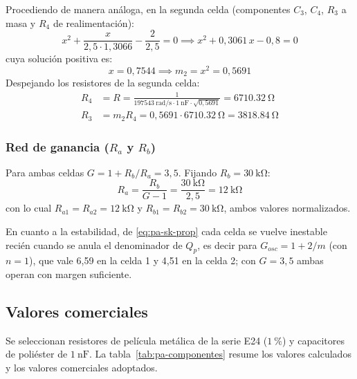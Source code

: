 Procediendo de manera análoga, en la segunda celda (componentes $C_3$, $C_4$, $R_3$ a masa y $R_4$ de
realimentación):
\begin{equation}
  x^2 + \frac{x}{2{,}5 \cdot 1{,}3066} - \frac{2}{2{,}5} = 0 \implies x^2 + 0{,}3061\,x - 0{,}8 = 0
\end{equation}
cuya solución positiva es:
\begin{equation}
  x = 0{,}7544 \implies m_2 = x^2 = 0{,}5691
\end{equation}
Despejando los resistores de la segunda celda:
\begin{align*}
  R_4 &= R = \frac{1}{\SI{197543}{\radian/\second} \cdot \SI{1}{\nano\farad} \cdot \sqrt{0{,}5691}}
    = \SI{6710.32}{\ohm} \\
  R_3 &= m_2 R_4 = 0{,}5691 \cdot \SI{6710.32}{\ohm} = \SI{3818.84}{\ohm}
\end{align*}

\subsubsection{Red de ganancia ($R_a$ y $R_b$)}

Para ambas celdas $G = 1 + R_b / R_a = 3{,}5$. Fijando $R_b = \SI{30}{\kilo\ohm}$:
\begin{equation}
  R_a = \frac{R_b}{G - 1} = \frac{\SI{30}{\kilo\ohm}}{2{,}5} = \SI{12}{\kilo\ohm}
\end{equation}
con lo cual $R_{a1} = R_{a2} = \SI{12}{\kilo\ohm}$ y $R_{b1} = R_{b2} = \SI{30}{\kilo\ohm}$, ambos valores
normalizados.

En cuanto a la estabilidad, de \eqref{eq:pa-sk-prop} cada celda se vuelve inestable recién cuando se anula el
denominador de $Q_p$, es decir para $G_{osc} = 1 + 2/m$ (con $n = 1$), que vale 6,59 en la celda 1 y 4,51 en la
celda 2; con $G = 3{,}5$ ambas operan con margen suficiente.

\subsection{Valores comerciales}
\label{subsec:pa-comerciales}

Se seleccionan resistores de película metálica de la serie E24 ($\SI{1}{\percent}$) y capacitores de poliéster de
$\SI{1}{\nano\farad}$. La tabla~\ref{tab:pa-componentes} resume los valores calculados y los valores comerciales
adoptados.

